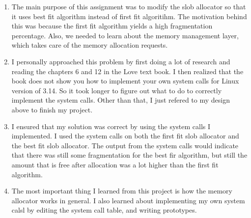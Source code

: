 \documentclass[letterpaper,10pt]{article}
\begin{document}
\begin{enumerate}
\item The main purpose of this assignment was to modify the slob allocator so that it uses best fit algorithm instead of first fit algoritihm. The motivation behind this was because the first fit algorithm yields a high fragmentation percentage. Also, we needed to learn about the memory management layer, which takes care of the memory allocation requests.
\\
\item I personally approached this problem by first doing a lot of research and reading the chapters 6 and 12 in the Love text book. I then realized that the book does not show you how to implement your own system calls for Linux version of 3.14. So it took longer to figure out what to do to correctly implement the system calls. Other than that, I just refered to my design above to finish my project.
\\
\item I ensured that my solution was correct by using the system calls I implemented. I used the system calls on both the first fit slob allocator and the best fit slob allocator. The output from the system calls would indicate that there was still some fragmentation for the best fir algorithm, but still the amount that is free after allocation was a lot higher than the first fit algorithm.
\\
\item The most important thing I learned from this project is how the memory allocator works in general. I also learned about implementing my own system calsl by editing the system call table, and writing prototypes.\\ 


\end{enumerate}




%
%
%
\end{document}
